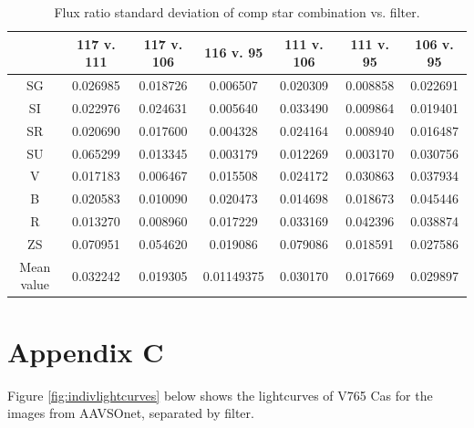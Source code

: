 \documentclass[linenumbers]{aastex631}
\begin{document}
\begin{table}[H]
    \centering
    \begin{tabular}{ | c || c | c | c | c | c | c | }
    \hline
        {} & 117 v. 111 & 117 v. 106 & 116 v. 95 & 111 v. 106 & 111 v. 95 & 106 v. 95 \\ \hline \hline
        SG & 0.026985 & 0.018726 & 0.006507 & 0.020309 & 0.008858 & 0.022691 \\ \hline
        SI & 0.022976 & 0.024631 & 0.005640 & 0.033490 & 0.009864 & 0.019401 \\ \hline
        SR & 0.020690 & 0.017600 & 0.004328 & 0.024164 & 0.008940 & 0.016487 \\ \hline
        SU & 0.065299 & 0.013345 & 0.003179 & 0.012269 & 0.003170 & 0.030756 \\ \hline
        V & 0.017183 & 0.006467 & 0.015508 & 0.024172 & 0.030863 & 0.037934 \\ \hline
        B & 0.020583 & 0.010090 & 0.020473 & 0.014698 & 0.018673 & 0.045446 \\ \hline
        R & 0.013270 & 0.008960 & 0.017229 & 0.033169 & 0.042396 & 0.038874 \\ \hline
        ZS & 0.070951 & 0.054620 & 0.019086 & 0.079086 & 0.018591 & 0.027586 \\ \hline \hline 
        Mean value & 0.032242 & 0.019305 & 0.01149375 & 0.030170 & 0.017669 & 0.029897 \\ \hline
    \end{tabular}
    \caption{Flux ratio standard deviation of comp star combination vs. filter.}
    \label{tab:stdevfluxcomps}
\end{table}
\section{Appendix C} \label{appc}
Figure \ref{fig:indivlightcurves} below shows the lightcurves of V765 Cas for the images from AAVSOnet, separated by filter.
\end{document}
